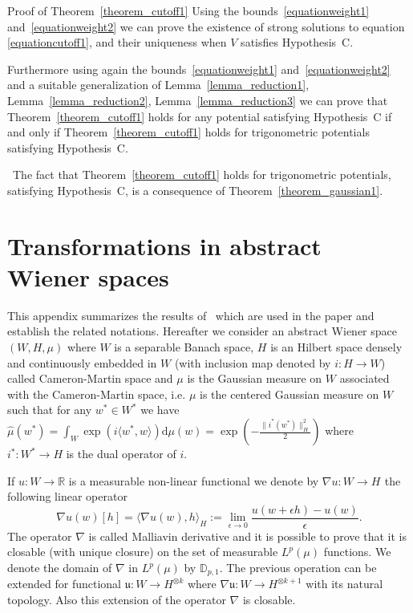 \documentclass[a4paper,10pt]{article}
\newcommand{\assign}{:=}
\newcommand{\asterisk}{\mathord{*}}
\newcommand{\mathd}{\mathrm{d}}
\newenvironment{proof*}[1]{\noindent\textbf{#1\ }}{\hspace*{\fill}$\Box$\medskip}
\begin{document}
\begin{proof*}{Proof of Theorem~\ref{theorem_cutoff1}}
  Using the bounds~{\eqref{equationweight1}} and~{\eqref{equationweight2}} we
  can prove the existence of strong solutions to equation
  {\eqref{equationcutoff1}}, and their uniqueness when $V$ satisfies
  Hypothesis~C.
  
  Furthermore using again the bounds~{\eqref{equationweight1}}
  and~{\eqref{equationweight2}} and a suitable generalization of
  Lemma~\ref{lemma_reduction1}, Lemma~\ref{lemma_reduction2},
  Lemma~\ref{lemma_reduction3} we can prove that Theorem~\ref{theorem_cutoff1}
  holds for any potential satisfying Hypothesis~C if and only if
  Theorem~\ref{theorem_cutoff1} holds for trigonometric potentials satisfying
  Hypothesis~C.
  
  \ The fact that Theorem~\ref{theorem_cutoff1} holds for trigonometric
  potentials, satisfying Hypothesis~C, is a consequence of
  Theorem~\ref{theorem_gaussian1}.
\end{proof*}

\appendix\section{Transformations in abstract Wiener
spaces}\label{appendix_wienerspace}

This appendix summarizes the results of~{\cite{Ustunel2000}} which are used in
the paper and establish the related notations. Hereafter we consider an
abstract Wiener space $(W, H, \mu)$ where $W$ is a separable Banach space, $H$
is an Hilbert space densely and continuously embedded in $W$ (with inclusion
map denoted by $i : H \rightarrow W$) called Cameron-Martin space and $\mu$ is
the Gaussian measure on $W$ associated with the Cameron-Martin space, i.e.
$\mu$ is the centered Gaussian measure on $W$ such that for any $w^{\asterisk}
\in W^{\asterisk}$ we have $\hat{\mu} (w^{\asterisk}) = \int_W \exp (i \langle
w^{\asterisk}, w \rangle) \mathd \mu (w) = \exp \left( - \frac{\|
i^{\asterisk} (w^{\asterisk}) \|_H^2}{2} \right)$ where $i^{\asterisk} :
W^{\asterisk} \rightarrow H$ is the dual operator of $i$.

If $u : W \rightarrow \mathbb{R}$ is a measurable non-linear functional we
denote by $\nabla u : W \rightarrow H^{}$ the following linear operator
\[ \nabla u (w) [h] = \langle \nabla u (w), h \rangle_H \assign
   \lim_{\epsilon \rightarrow 0} \frac{u (w + \epsilon h) - u (w)}{\epsilon} .
\]
The operator $\nabla$ is called Malliavin derivative and it is possible to
prove that it is closable (with unique closure) on the set of measurable $L^p
(\mu)$ functions. We denote the domain of $\nabla$ in $L^p (\mu)$ by
$\mathbb{D}_{p, 1}$. The previous operation can be extended for functional
$\mathfrak{u} : W \rightarrow H^{\otimes k}$ where $\nabla \mathfrak{u} : W
\rightarrow H^{\otimes k + 1}$ with its natural topology. Also this extension
of the operator $\nabla$ is closable.
\end{document}
